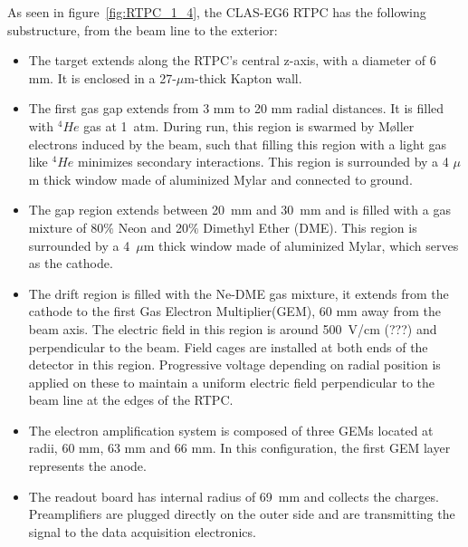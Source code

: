 \documentclass[twocolumn,showpacs,superscriptaddress,groupedaddress]{revtex4}
\begin{document}
As seen in figure~\ref{fig:RTPC_1_4}, the CLAS-EG6 RTPC has the following 
substructure, from the beam line to the exterior:\\
\begin{itemize}
   \item The target extends along the RTPC's central z-axis, with a diameter of 
      6 mm. It is enclosed in a 27-$\mu$m-thick Kapton wall.

   \item The first gas gap extends from 3 mm to 20 mm radial distances. It is 
      filled with $^{4}He$ gas at 1~atm. During run, this region is swarmed by 
      M\o ller electrons induced by the beam, such that filling this region 
      with a light gas like $^{4}He$ minimizes secondary interactions. This 
      region is surrounded by a 4 $\mu$m thick window made of aluminized Mylar 
      and connected to ground.                                                                
   \item The gap region extends between 20~mm and 30~mm and is filled with a 
      gas mixture of 80$\%$ Neon and 20$\%$ Dimethyl Ether (DME). This region 
      is surrounded by a 4~$\mu$m thick window made of aluminized Mylar, which 
      serves as the cathode.

   \item The drift region is filled with the Ne-DME gas mixture, it extends 
      from the cathode to the first Gas Electron Multiplier(GEM), 60 mm away 
      from the beam axis. The electric field in this region is around 500~V/cm 
      (???) and perpendicular to the beam. Field cages are installed at both 
      ends of the detector in this region. Progressive voltage depending on 
      radial position is applied on these to maintain a uniform electric field 
      perpendicular to the beam line at the edges of the RTPC.
   
   \item The electron amplification system is composed of three GEMs located at 
      radii, 60 mm, 63 mm and 66 mm. In this configuration, the first GEM layer 
      represents the anode.

   \item The readout board has internal radius of 69~mm and collects the 
      charges. Preamplifiers are plugged directly on the outer side and are 
      transmitting the signal to the data acquisition electronics.
\end{itemize}
\end{document}
